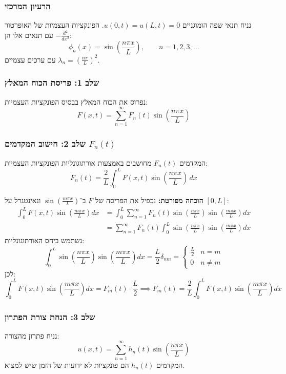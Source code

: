 \subsubsection{הרעיון המרכזי}
נניח תנאי שפה הומוגניים $u(0,t)=u(L,t)=0$. הפונקציות העצמיות של האופרטור $-\frac{d^2}{dx^2}$ עם תנאים אלו הן:
\[
\phi_n(x) = \sin\!\left(\frac{n\pi x}{L}\right), \qquad n=1,2,3,\dots
\]
עם ערכים עצמיים $\lambda_n = \left(\frac{n\pi}{L}\right)^2$.

\subsubsection{שלב 1: פריסת הכוח המאלץ}
נפרוס את הכוח המאלץ בבסיס הפונקציות העצמיות:
\[
F(x,t)=\sum_{n=1}^\infty F_n(t)\sin\!\left(\frac{n\pi x}{L}\right)
\]

\subsubsection{שלב 2: חישוב המקדמים $F_n(t)$}
המקדמים $F_n(t)$ מחושבים באמצעות אורתוגונליות הפונקציות העצמיות:
\[
\boxed{F_n(t)=\frac{2}{L}\int_0^L F(x,t)\sin\!\left(\frac{n\pi x}{L}\right)\,dx}
\]

\textbf{הוכחה מפורטת:} נכפיל את הפריסה של $F$ ב־$\sin\left(\frac{m\pi x}{L}\right)$ ונאינטגרל על $[0,L]$:
\begin{align*}
\int_0^L F(x,t)\sin\!\left(\frac{m\pi x}{L}\right)dx &= \int_0^L \sum_{n=1}^\infty F_n(t) \sin\!\left(\frac{n\pi x}{L}\right)\sin\!\left(\frac{m\pi x}{L}\right)dx \\
&= \sum_{n=1}^\infty F_n(t) \int_0^L \sin\!\left(\frac{n\pi x}{L}\right)\sin\!\left(\frac{m\pi x}{L}\right)dx
\end{align*}
נשתמש ביחס האורתוגונליות:
\[
\int_0^L \sin\!\left(\frac{n\pi x}{L}\right)\sin\!\left(\frac{m\pi x}{L}\right)dx = \frac{L}{2}\delta_{nm} = \begin{cases} \frac{L}{2} & n=m \\ 0 & n \neq m \end{cases}
\]
לכן:
\[
\int_0^L F(x,t)\sin\!\left(\frac{m\pi x}{L}\right)dx = F_m(t) \cdot \frac{L}{2} \implies F_m(t) = \frac{2}{L}\int_0^L F(x,t)\sin\!\left(\frac{m\pi x}{L}\right)dx
\]

\subsubsection{שלב 3: הנחת צורת הפתרון}
נניח פתרון מהצורה:
\[
u(x,t)=\sum_{n=1}^\infty h_n(t)\sin\!\left(\frac{n\pi x}{L}\right)
\]
המקדמים $h_n(t)$ הם פונקציות לא ידועות של הזמן שיש למצוא.

